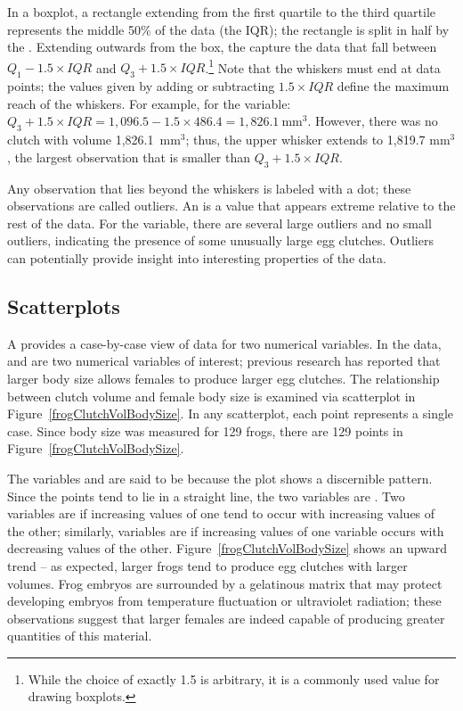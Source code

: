 \begin{doublespace}
In a boxplot, a rectangle extending from the first quartile to the third quartile represents the middle 50\% of the data (the IQR); the rectangle is split in half by the . Extending outwards from the box, the  capture the data that fall between $Q_1 - 1.5\times IQR$ and $Q_3 + 1.5\times IQR$.\footnote{While the choice of exactly 1.5 is arbitrary, it is a commonly used value for drawing boxplots.} Note that the whiskers must end at data points; the values given by adding or subtracting $1.5\times IQR$ define the maximum reach of the whiskers. For example, for the  variable: $Q_3 + 1.5\times IQR = 1,096.5 - 1.5\times 486.4 = 1,826.1\ \textrm {mm}^{3}$. However, there was no clutch with volume 1,826.1\ $\textrm {mm}^{3}$; thus, the upper whisker extends to 1,819.7 $\textrm {mm}^{3}$, the largest observation that is smaller than $Q_3 + 1.5\times IQR$.

Any observation that lies beyond the whiskers is labeled with a dot; these observations are called outliers. An  is a value that appears extreme relative to the rest of the data. For the  variable, there are several large outliers and no small outliers, indicating the presence of some unusually large egg clutches. Outliers can potentially provide insight into interesting properties of the data. 

\subsection{Scatterplots}
\label{scatterPlots}

A  provides a case-by-case view of data for two numerical variables. In the  data,  and  are two numerical variables of interest; previous research has reported that larger body size allows females to produce larger egg clutches. The relationship between clutch volume and female body size is examined via scatterplot in Figure~\ref{frogClutchVolBodySize}. In any scatterplot, each point represents a single case. Since body size was measured for 129 frogs, there are 129 points in Figure~\ref{frogClutchVolBodySize}.

The variables  and  are said to be  because the plot shows a discernible pattern. Since the points tend to lie in a straight line, the two variables are . Two variables are  if increasing values of one tend to occur with increasing values of the other; similarly, variables are  if increasing values of one variable occurs with decreasing values of the other. Figure~\ref{frogClutchVolBodySize} shows an upward trend -- as expected, larger frogs tend to produce egg clutches with larger volumes. Frog embryos are surrounded by a gelatinous matrix that may protect developing embryos from temperature fluctuation or ultraviolet radiation; these observations suggest that larger females are indeed capable of producing greater quantities of this material.


\end{doublespace}
